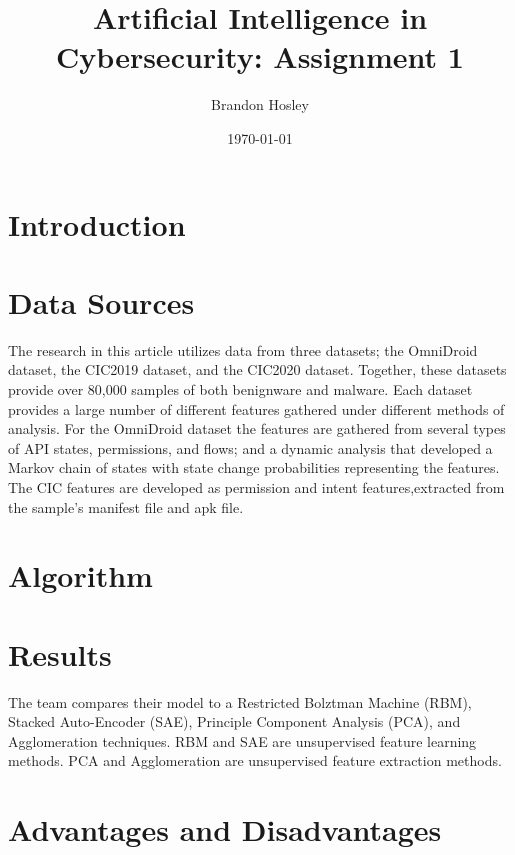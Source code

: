 \documentclass[]{article}
\title{Artificial Intelligence in Cybersecurity: Assignment 1}
\author{Brandon Hosley}
\date{\today}
\begin{document}
	\maketitle
	
\section{Introduction}

\section{Data Sources}

The research in this article utilizes data from three datasets; 
the OmniDroid \cite{Martin2019} dataset,  
the CIC2019 \cite{Taheri2019} dataset, and
the CIC2020 \cite{Rahali2020} dataset.
Together, these datasets provide over 80,000 samples of both benignware and malware.
Each dataset provides a large number of different features gathered under different methods of analysis.
For the OmniDroid dataset the features are gathered from several types of API states, permissions, and flows;
and a dynamic analysis that developed a Markov chain of states with state change probabilities representing the features.
The CIC features are developed as permission and intent features,extracted from the sample's manifest file and apk file.

\section{Algorithm}


\section{Results}

The team compares their model to a Restricted Bolztman Machine (RBM), Stacked Auto-Encoder (SAE), Principle Component Analysis (PCA), and Agglomeration techniques.
RBM and SAE are unsupervised feature learning methods. 
PCA and Agglomeration are unsupervised feature extraction methods.

\section{Advantages and Disadvantages}
\end{document}

